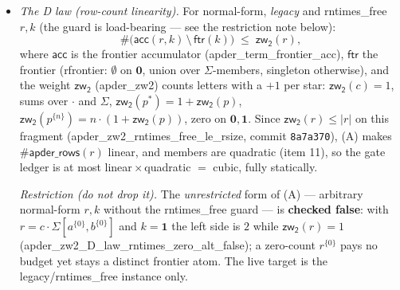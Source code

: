 \documentclass[11pt]{article}
\theoremstyle{remark}
\newcommand{\ZERO}{\mathbf{0}}
\newcommand{\ONE}{\mathbf{1}}
\newcommand{\rs}[1]{\lvert #1\rvert}                 %
\newcommand{\thy}[1]{\textsf{\small #1}}
\begin{document}
\begin{itemize}
\item[\textbf{(A)}] \emph{The D law (row-count linearity).}  For normal-form,
\emph{legacy} and \thy{rntimes\_free} $r,k$ (the guard is load-bearing --- see
the restriction note below):
\[
\#\bigl(\mathsf{acc}(r,k)\,\setminus\,\mathsf{ftr}(k)\bigr)
  \;\le\;\mathsf{zw_2}(r),
\]
where $\mathsf{acc}$ is the frontier accumulator
(\thy{apder\_term\_frontier\_acc}), $\mathsf{ftr}$ the frontier
(\thy{rfrontier}: $\emptyset$ on $\ZERO$, union over $\Sigma$-members,
singleton otherwise), and the weight $\mathsf{zw_2}$ (\thy{apder\_zw2})
counts letters with a $+1$ per star: $\mathsf{zw_2}(c)=1$, sums over
${\cdot}$ and $\Sigma$,
$\mathsf{zw_2}(p^{*})=1+\mathsf{zw_2}(p)$,
$\mathsf{zw_2}(p^{\{n\}})=n\cdot(1+\mathsf{zw_2}(p))$, zero on
$\ZERO,\ONE$.  Since $\mathsf{zw_2}(r)\le\rs{r}$ on this fragment
(\thy{apder\_zw2\_rntimes\_free\_le\_rsize}, commit \texttt{8a7a370}), (A)
makes $\#\mathsf{apder\_rows}(r)$ linear, and members are quadratic (item 11),
so the gate ledger is at most linear${}\times{}$quadratic ${}={}$ cubic, fully
statically.

\emph{Restriction (do not drop it).}  The \emph{unrestricted} form of (A) ---
arbitrary normal-form $r,k$ without the \thy{rntimes\_free} guard --- is
\textbf{checked false}: with $r=c\cdot\Sigma[a^{\{0\}},b^{\{0\}}]$ and $k=\ONE$
the left side is $2$ while $\mathsf{zw_2}(r)=1$
(\thy{apder\_zw2\_D\_law\_rntimes\_zero\_alt\_false}); a zero-count
$r^{\{0\}}$ pays no budget yet stays a distinct frontier atom.  The live
target is the legacy/\thy{rntimes\_free} instance only.


\end{itemize}
\end{document}
